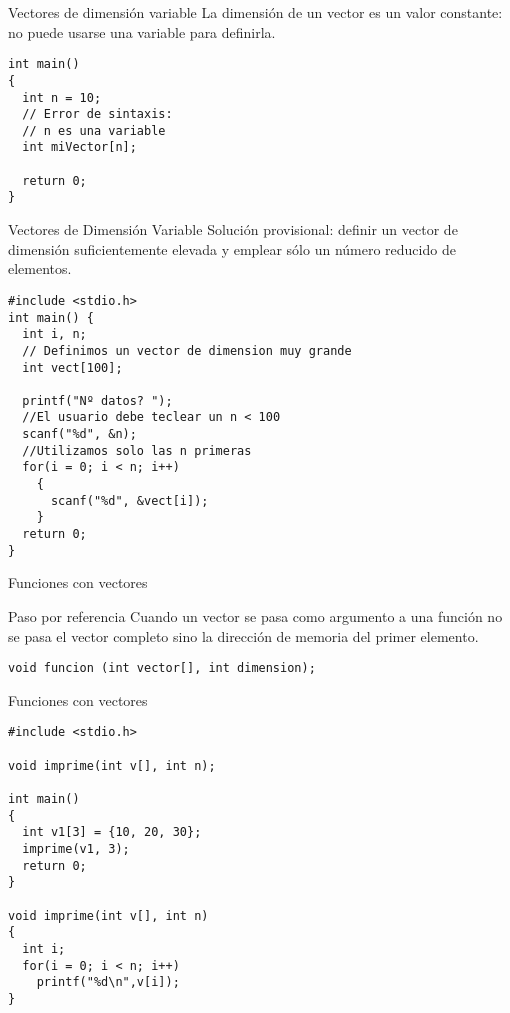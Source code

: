 \documentclass[xcolor={usenames,svgnames,dvipsnames}, aspectratio=169]{beamer}
\begin{document}
\begin{frame}[label={sec:orgeaf3fac},fragile]{Vectores de dimensión variable}
 La dimensión de un vector es un valor constante: \alert{no puede usarse una variable} para definirla.

\lstset{language=C,label= ,caption= ,captionpos=b,numbers=none}
\begin{lstlisting}
int main()
{
  int n = 10;
  // Error de sintaxis:
  // n es una variable
  int miVector[n];

  return 0;
}
\end{lstlisting}
\end{frame}

\begin{frame}[label={sec:org4d1ccb0},fragile]{Vectores de Dimensión Variable}
 \alert{Solución provisional}: definir un vector de dimensión suficientemente elevada y emplear sólo un número reducido de elementos.
\lstset{language=C,label= ,caption= ,captionpos=b,numbers=none}
\begin{lstlisting}
#include <stdio.h>
int main() {
  int i, n;
  // Definimos un vector de dimension muy grande
  int vect[100];

  printf("Nº datos? ");
  //El usuario debe teclear un n < 100
  scanf("%d", &n); 
  //Utilizamos solo las n primeras
  for(i = 0; i < n; i++) 
    {
      scanf("%d", &vect[i]);
    }
  return 0;
}
\end{lstlisting}
\end{frame}
\begin{frame}[label={sec:orgb77c948},fragile]{Funciones con vectores}
 \begin{block}{Paso por referencia}
Cuando un vector se pasa como argumento a una función \alert{no se pasa el vector completo} sino la \alert{dirección de memoria del primer elemento}.
\lstset{language=C,label= ,caption= ,captionpos=b,numbers=none}
\begin{lstlisting}
void funcion (int vector[], int dimension);
\end{lstlisting}
\end{block}
\end{frame}

\begin{frame}[label={sec:org863a762},fragile]{Funciones con vectores}
 \lstset{language=C,label= ,caption= ,captionpos=b,numbers=none}
\begin{lstlisting}
#include <stdio.h>

void imprime(int v[], int n);

int main()
{
  int v1[3] = {10, 20, 30};
  imprime(v1, 3);
  return 0;
} 

void imprime(int v[], int n)
{
  int i;
  for(i = 0; i < n; i++)
    printf("%d\n",v[i]);
}
\end{lstlisting}
\end{frame}
\end{document}
